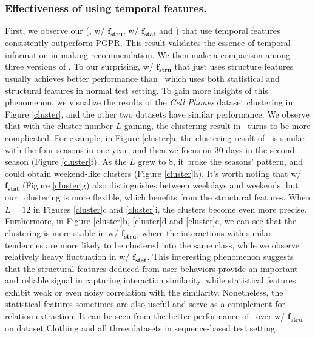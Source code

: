 \subsubsection{\textbf{Effectiveness of using temporal features.}}
 First, we observe our \tkgrec  (\ie, w/ $\boldsymbol{f_{stru}}$, w/ $\boldsymbol{f_{stat}}$ and \tkgrec) that use temporal features consistently outperform PGPR. This result validates the essence of temporal information in making recommendation. We then make a comparison among three versions of \tkgrec. To our surprising, w/ $\boldsymbol{f_{stru}}$ that just uses structure features usually achieves better performance than \tkgrec\ 
which uses both statistical and structural features in normal test setting. To gain more insights of this phenomenon, we visualize the results of the \textit{Cell Phones} dataset  clustering in Figure \ref{cluster}, and the other two datasets have similar performance.
 We observe that with the cluster number $L$ gaining, the clustering result in \tkgrec\ turns to be more complicated. 
 For example, in Figure \ref{cluster}a, the clustering result of \tkgrec\ is similar with the four seasons in one year,
and then we focus on 30 days in the second season (Figure \ref{cluster}f). As the $L$ grew to $8$, it broke the seasons' pattern, and could obtain weekend-like clusters (Figure \ref{cluster}h). It’s worth noting that w/ $\boldsymbol{f_{stat}}$ (Figure \ref{cluster}g) also distinguishes between weekdays and weekends, but our \tkgrec\ clustering is more flexible, which benefits from the structural features. When $L = 12$ in Figures \ref{cluster}c and \ref{cluster}i, the clusters become even more precise. 
%
 Furthermore, in Figure \ref{cluster}b, \ref{cluster}d and \ref{cluster}e, 
 we can see that the clustering is more stable in w/ $\boldsymbol{f_{stru}}$, where the interactions with similar tendencies are more likely to be clustered into the same class, while we observe relatively heavy fluctuation in w/ $\boldsymbol{f_{stat}}$. 
 This interesting phenomenon suggests that the structural features deduced from user behaviors provide an important and reliable signal in capturing interaction similarity, while statistical features exhibit weak or even noisy correlation with the similarity. Nonetheless, the statistical features sometimes are also useful and serve as a complement for relation extraction. It can be seen from the better performance of \tkgrec\ over w/ $\boldsymbol{f_{stru}}$ on dataset Clothing and all three datasets in sequence-based test setting.

